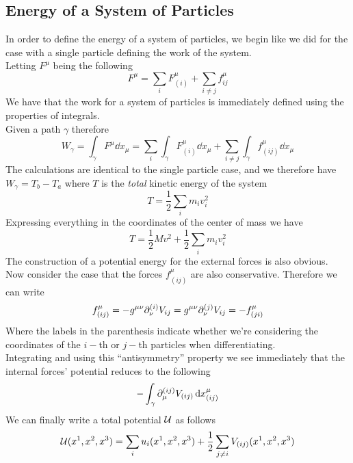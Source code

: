 \documentclass[../admech.tex]{subfiles}
\begin{document}
\subsection{Energy of a System of Particles}
In order to define the energy of a system of particles, we begin like we did for the case with a single particle defining the work of the system.\\
Letting $F^\mu$ being the following
\begin{equation*}
	F^\mu=\sum_iF^\mu_{(i)}+\sum_{i\ne j}f^\mu_{ij}
\end{equation*}
We have that the work for a system of particles is immediately defined using the properties of integrals.\\
Given a path $\gamma$ therefore
\begin{equation}
	W_\gamma=\int_{\gamma}^{}F^\mu\dd{x_\mu}=\sum_i\int_{\gamma}^{}F^\mu_{(i)}\dd{x_\mu}+\sum_{i\ne j}\int_{\gamma}^{}f^\mu_{(ij)}\dd{x_\mu}
	\label{eq:worksystem}
\end{equation}
The calculations are identical to the single particle case, and we therefore have $W_{\gamma}=T_b-T_a$ where $T$ is the \emph{total} kinetic energy of the system
\begin{equation}
	T=\frac{1}{2}\sum_im_iv_i^2
	\label{eq:totalkinen}
\end{equation}
Expressing everything in the coordinates of the center of mass we have
\begin{equation}
	T=\frac{1}{2}Mv^2+\frac{1}{2}\sum_{i}^{}m_iv^2_i
	\label{eq:cmtotkin}
\end{equation}
The construction of a potential energy for the external forces is also obvious.\\
Now consider the case that the forces $f^\mu_{(ij)}$ are also conservative. Therefore we can write
\begin{equation}
	f_{(ij)}^\mu=-g^{\mu\nu}\partial_{\nu}^{(i)}V_{ij}=g^{\mu\nu}\partial_\nu^{(j)}V_{ij}=-f^\mu_{(ji)}
	\label{eq:potintfor}
\end{equation}
Where the labels in the parenthesis indicate whether we're considering the coordinates of the $i-$th or $j-$th particles when differentiating.\\
Integrating and using this ``antisymmetry'' property we see immediately that the internal forces' potential reduces to the following
\begin{equation}
	-\int_{\gamma}^{}\partial_\mu^{(ij)}V_{(ij)}\dd{x^\mu_{(ij)}}
	\label{eq:internalpotint}
\end{equation}
We can finally write a total potential $\mathcal{U}$ as follows
\begin{equation}
	\mathcal{U}(x^1,x^2,x^3)=\sum_iu_i(x^1,x^2,x^3)+\frac{1}{2}\sum_{j\ne i}V_{(ij)}(x^1,x^2,x^3)
	\label{eq:totalpot}
\end{equation}
\end{document}
